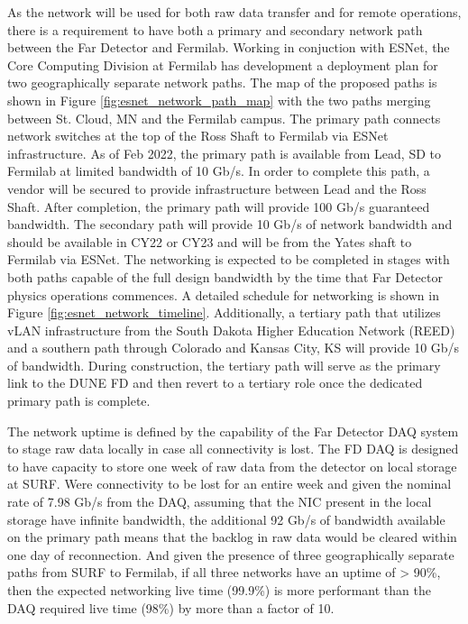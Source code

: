\documentclass[../main-v1.tex]{subfiles}
\begin{document}
As the network will be used for both raw data transfer and for remote operations, there is a requirement to have both a primary and secondary network path between the Far Detector and Fermilab. Working in conjuction with ESNet, the Core Computing Division at Fermilab has development a deployment plan for two geographically separate network paths. The map of the proposed paths is shown in Figure \ref{fig:esnet_network_path_map} with the two paths merging between St. Cloud, MN and the Fermilab campus. The primary path connects network switches at the top of the Ross Shaft to Fermilab via ESNet infrastructure. As of Feb 2022, the primary path is available from Lead, SD to Fermilab at limited bandwidth of 10 Gb/s. In order to complete this path, a vendor will be secured to provide infrastructure between Lead and the Ross Shaft. After completion, the primary path will provide 100 Gb/s guaranteed bandwidth. The secondary path will provide 10 Gb/s of network bandwidth and should be available in CY22 or CY23 and will be from the Yates shaft to Fermilab via ESNet. The networking is expected to be completed in stages with both paths capable of the full design bandwidth by the time that Far Detector physics operations commences. A detailed schedule for networking is shown in Figure \ref{fig:esnet_network_timeline}. Additionally, a tertiary path that utilizes vLAN infrastructure from the South Dakota Higher Education Network (REED) and a southern path through Colorado and Kansas City, KS will provide 10 Gb/s of bandwidth. During construction, the tertiary path will serve as the primary link to the DUNE FD and then revert to a tertiary role once the dedicated primary path is complete.

The network uptime is defined by the capability of the Far Detector DAQ system to stage raw data locally in case all connectivity is lost. The FD DAQ is designed to have capacity to store one week of raw data from the detector on local storage at SURF. Were connectivity to be lost for an entire week and given the nominal rate of 7.98 Gb/s from the DAQ, assuming that the NIC present in the local storage have infinite bandwidth, the additional 92 Gb/s of bandwidth available on the primary path means that the backlog in raw data would be cleared within one day of reconnection. And given the presence of three geographically separate paths from SURF to Fermilab, if all three networks have an uptime of > 90\%, then the expected networking live time (99.9\%) is more performant than the DAQ required live time (98\%) by more than a factor of 10.
\end{document}
